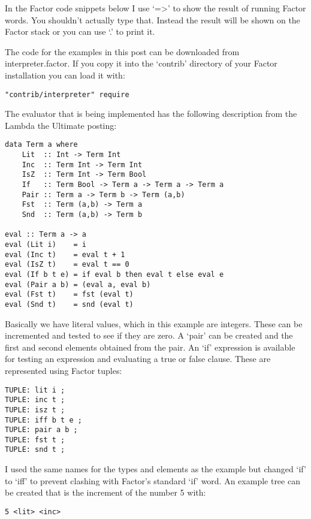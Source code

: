 In the Factor code snippets below I use `=>' to show the result of
running Factor words. You shouldn't actually type that. Instead the
result will be shown on the Factor stack or you can use `.' to print
it.

The code for the examples in this post can be downloaded from
interpreter.factor. If you copy it into the `contrib' directory of
your Factor installation you can load it with:


\begin{verbatim}
"contrib/interpreter" require
\end{verbatim}

The evaluator that is being implemented has the following description
 from the Lambda the Ultimate posting:

\begin{verbatim}
data Term a where
    Lit  :: Int -> Term Int
    Inc  :: Term Int -> Term Int
    IsZ  :: Term Int -> Term Bool
    If   :: Term Bool -> Term a -> Term a -> Term a
    Pair :: Term a -> Term b -> Term (a,b)
    Fst  :: Term (a,b) -> Term a
    Snd  :: Term (a,b) -> Term b 
  
eval :: Term a -> a
eval (Lit i)    = i
eval (Inc t)    = eval t + 1
eval (IsZ t)    = eval t == 0
eval (If b t e) = if eval b then eval t else eval e
eval (Pair a b) = (eval a, eval b)
eval (Fst t)    = fst (eval t)
eval (Snd t)    = snd (eval t)
\end{verbatim}

Basically we have literal values, which in this example are
 integers. These can be incremented and tested to see if they are
 zero. A `pair' can be created and the first and second elements
 obtained from the pair. An `if' expression is available for testing
 an expression and evaluating a true or false clause. These are
 represented using Factor tuples:

\begin{verbatim}
TUPLE: lit i ;
TUPLE: inc t ;
TUPLE: isz t ;
TUPLE: iff b t e ;
TUPLE: pair a b ;
TUPLE: fst t ;
TUPLE: snd t ;
\end{verbatim}

I used the same names for the types and elements as the example but
changed `if' to `iff' to prevent clashing with Factor's standard `if'
word. An example tree can be created that is the increment of the
number 5 with:

\begin{verbatim}
5 <lit> <inc>
\end{verbatim}

